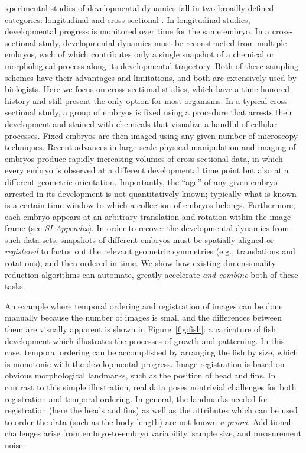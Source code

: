 \documentclass{pnastwo}
\begin{document}
\begin{article}
xperimental studies of developmental dynamics fall in two broadly defined categories: longitudinal and cross-sectional \cite{diggle2002analysis}.
%
In longitudinal studies, developmental progress is monitored over time for the same embryo.
%
In a cross-sectional study, developmental dynamics must be reconstructed from multiple embryos, each of which contributes only a single snapshot of a chemical or morphological process along its developmental trajectory.
%
Both of these sampling schemes have their advantages and limitations, and both are extensively used by biologists.
%
Here we focus on cross-sectional studies, which have a time-honored history and still present the only option for most organisms.
%
In a typical cross-sectional study, a group of embryos is fixed using a procedure that arrests their development and stained with chemicals that visualize a handful of cellular processes.
%
Fixed embryos are then imaged using any given number of microscopy techniques.
%
Recent advances in large-scale
physical manipulation and imaging of embryos produce rapidly increasing volumes of cross-sectional data, in which every embryo is observed at a different developmental time point but also at a different geometric orientation.
%
Importantly, the ``age'' of any given embryo arrested in its development is not quantitatively known; typically what is known is
a certain time window to which a collection of embryos belongs.
%
Furthermore, each embryo appears at an arbitrary translation and rotation within the image frame (see {\it SI Appendix}).
%
In order to recover the developmental dynamics from such data sets, snapshots of different embryos must be spatially aligned or {\em registered} to factor out the relevant geometric symmetries (e.g., translations and rotations), and then ordered in time.
%
We show how existing dimensionality reduction algorithms can automate, greatly accelerate {\it and combine} both of these tasks.

An example where
temporal ordering and registration of images can be done manually
because the number of images is small and the differences between them are visually apparent is shown
in Figure~\ref{fig:fish}: a caricature of fish development which illustrates the processes of growth and patterning.
%
In this case, temporal ordering can be accomplished by arranging the fish by size, which is monotonic with the developmental progress.
%
Image registration is based on obvious morphological landmarks, such as the position of head and fins.
%
In contrast to this simple illustration, real data poses nontrivial challenges for both registration and temporal ordering.
%
In general, the landmarks needed for registration (here the heads and fins) as well as the attributes which can be used to order the data (such as the body length) are not known {\it a priori}.
%
Additional challenges arise from embryo-to-embryo variability, sample size, and measurement noise.


\end{article}
\end{document}
